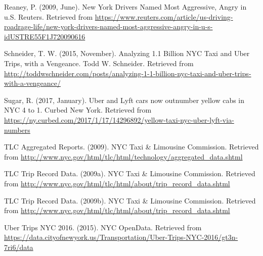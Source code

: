 \documentclass[12pt,twoside]{reedthesis}
\theoremstyle{definition}
\theoremstyle{definition}
\theoremstyle{definition}
\theoremstyle{remark}
\begin{document}
\hypertarget{ref-reaney2009}{}
Reaney, P. (2009, June). New York Drivers Named Most Aggressive, Angry
in u.S. Reuters. Retrieved from
\url{https://www.reuters.com/article/us-driving-roadrage-life/new-york-drivers-named-most-aggressive-angry-in-u-s-idUSTRE55F1J720090616}

\hypertarget{ref-schneider2015}{}
Schneider, T. W. (2015, November). Analyzing 1.1 Billion NYC Taxi and
Uber Trips, with a Vengeance. Todd W. Schneider. Retrieved from
\url{http://toddwschneider.com/posts/analyzing-1-1-billion-nyc-taxi-and-uber-trips-with-a-vengeance/}

\hypertarget{ref-sugar2017}{}
Sugar, R. (2017, January). Uber and Lyft cars now outnumber yellow cabs
in NYC 4 to 1. Curbed New York. Retrieved from
\url{https://ny.curbed.com/2017/1/17/14296892/yellow-taxi-nyc-uber-lyft-via-numbers}

\hypertarget{ref-datayellowmonth}{}
TLC Aggregated Reports. (2009). NYC Taxi \& Limousine Commission.
Retrieved from
\url{http://www.nyc.gov/html/tlc/html/technology/aggregated_data.shtml}

\hypertarget{ref-datayellow}{}
TLC Trip Record Data. (2009a). NYC Taxi \& Limousine Commission.
Retrieved from
\url{http://www.nyc.gov/html/tlc/html/about/trip_record_data.shtml}

\hypertarget{ref-datauber}{}
TLC Trip Record Data. (2009b). NYC Taxi \& Limousine Commission.
Retrieved from
\url{http://www.nyc.gov/html/tlc/html/about/trip_record_data.shtml}

\hypertarget{ref-datauberweek}{}
Uber Trips NYC 2016. (2015). NYC OpenData. Retrieved from
\url{https://data.cityofnewyork.us/Transportation/Uber-Trips-NYC-2016/gt3n-7ri6/data}


\end{document}
